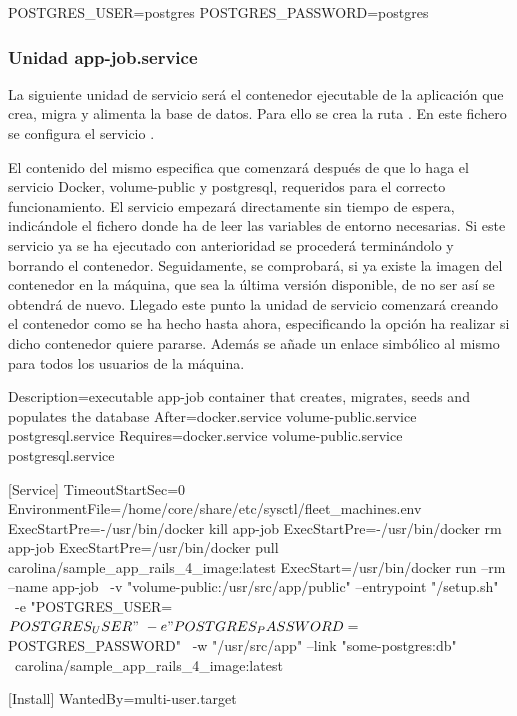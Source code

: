 \begin{codelisting}
\label{code:credentials}
\begin{code}
POSTGRES_USER=postgres
POSTGRES_PASSWORD=postgres
\end{code}
\end{codelisting}

\subsubsection{Unidad app-job.service}

La siguiente unidad de servicio será el contenedor ejecutable de la aplicación que crea, migra y alimenta la base de datos. Para ello se crea la ruta . En este fichero se configura el servicio .

El contenido del mismo especifica que comenzará después de que lo haga el servicio Docker, volume-public y postgresql, requeridos para el correcto funcionamiento. El servicio empezará directamente sin tiempo de espera, indicándole el fichero donde ha de leer las variables de entorno necesarias. Si este servicio ya se ha ejecutado con anterioridad se procederá terminándolo y borrando el contenedor. Seguidamente, se comprobará, si ya existe la imagen del contenedor en la máquina, que sea la última versión disponible, de no ser así se obtendrá de nuevo. Llegado este punto la unidad de servicio comenzará creando el contenedor como se ha hecho hasta ahora, especificando la opción ha realizar si dicho contenedor quiere pararse. Además se añade un enlace simbólico al mismo para todos los usuarios de la máquina. 

\begin{codelisting}
\label{code:app-job.service}
\begin{code}
[Unit] 
  Description=executable app-job container that creates, migrates, seeds and 
              populates the database
  After=docker.service volume-public.service postgresql.service
  Requires=docker.service volume-public.service postgresql.service

[Service] 
  TimeoutStartSec=0 
  EnvironmentFile=/home/core/share/etc/sysctl/fleet_machines.env
  ExecStartPre=-/usr/bin/docker kill app-job 
  ExecStartPre=-/usr/bin/docker rm app-job 
  ExecStartPre=/usr/bin/docker pull carolina/sample_app_rails_4_image:latest 
  ExecStart=/usr/bin/docker run --rm --name app-job \
  -v "volume-public:/usr/src/app/public" --entrypoint "/setup.sh" \
  -e "POSTGRES_USER=${POSTGRES_USER}" \
  -e "POSTGRES_PASSWORD=${POSTGRES_PASSWORD}" \
  -w "/usr/src/app" --link "some-postgres:db" \
  carolina/sample_app_rails_4_image:latest

[Install] 
  WantedBy=multi-user.target
\end{code}
\end{codelisting}

